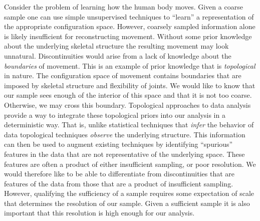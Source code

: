 Consider the problem of learning how the human body moves.
Given a coarse sample one can use simple unsupervised techniques to ``learn'' a representation of the appropriate configuration space.
However, coarsely sampled information alone is likely insufficient for reconstructing movement.
Without some prior knowledge about the underlying skeletal structure the resulting movement may look unnatural.
Discontinuities would arise from a lack of knowledge about the \emph{boundaries} of movement.
This is an example of prior knowledge that is \emph{topological} in nature.
The configuration space of movement contains boundaries that are imposed by skeletal structure and flexibility of joints.
We would like to know that our sample sees enough of the interior of this space and that it is not too coarse.
Otherwise, we may cross this boundary.
Topological approaches to data analysis provide a way to integrate these topological priors into our analysis in a deterministic way.
That is, unlike statistical techniques that \emph{infer} the behavior of data topological techniques \emph{observe} the underlying structure.
%
This information can then be used to augment existing techniques by identifying ``spurious'' features in the data that are not representative of the underlying space.
These features are often a product of either insufficient sampling, or poor resolution.
We would therefore like to be able to differentiate from discontinuities that are features of the data from those that are a product of insufficient sampling.
However, qualifying the sufficiency of a sample requires some expectation of scale that determines the resolution of our sample.
Given a sufficient sample it is also important that this resolution is high enough for our analysis.

